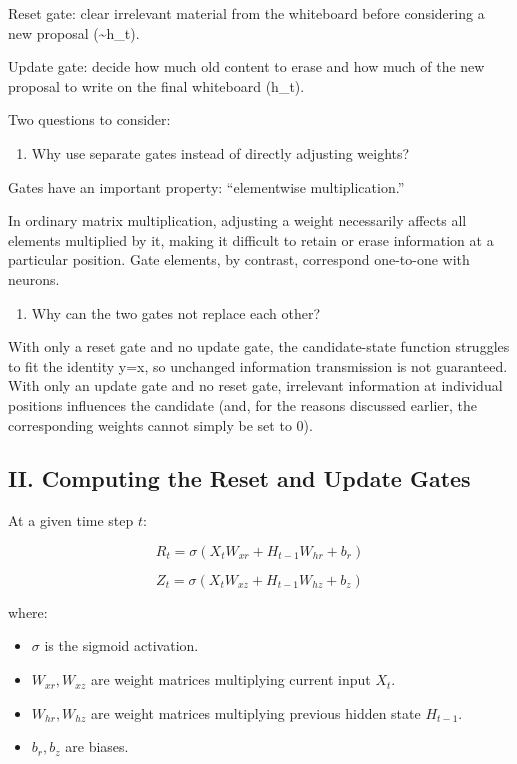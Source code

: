 Reset gate: clear irrelevant material from the whiteboard before considering a new proposal (\textasciitilde h\_t).

Update gate: decide how much old content to erase and how much of the new proposal to write on the final whiteboard (h\_t).

Two questions to consider:

\begin{enumerate}
\def\labelenumi{\arabic{enumi}.}
\tightlist
\item
  Why use separate gates instead of directly adjusting weights?
\end{enumerate}

Gates have an important property: ``elementwise multiplication.''

In ordinary matrix multiplication, adjusting a weight necessarily affects all elements multiplied by it, making it difficult to retain or erase information at a particular position. Gate elements, by contrast, correspond one-to-one with neurons.

\begin{enumerate}
\def\labelenumi{\arabic{enumi}.}
\setcounter{enumi}{1}
\tightlist
\item
  Why can the two gates not replace each other?
\end{enumerate}

With only a reset gate and no update gate, the candidate-state function struggles to fit the identity y=x, so unchanged information transmission is not guaranteed. With only an update gate and no reset gate, irrelevant information at individual positions influences the candidate (and, for the reasons discussed earlier, the corresponding weights cannot simply be set to 0).

\hypertarget{ii.-computing-the-reset-and-update-gates}{%
\subsection{II. Computing the Reset and Update Gates}\label{ii.-computing-the-reset-and-update-gates}}

At a given time step \(t\):

\[
R_t = \sigma(X_t W_{xr} + H_{t-1}W_{hr} + b_r)
\]

\[
Z_t = \sigma(X_t W_{xz} + H_{t-1}W_{hz} + b_z)
\]

where:

\begin{itemize}
\tightlist
\item
  \(\sigma\) is the sigmoid activation.
\item
  \(W_{xr}, W_{xz}\) are weight matrices multiplying current input \(X_t\).
\item
  \(W_{hr}, W_{hz}\) are weight matrices multiplying previous hidden state \(H_{t-1}\).
\item
  \(b_r, b_z\) are biases.
\end{itemize}

